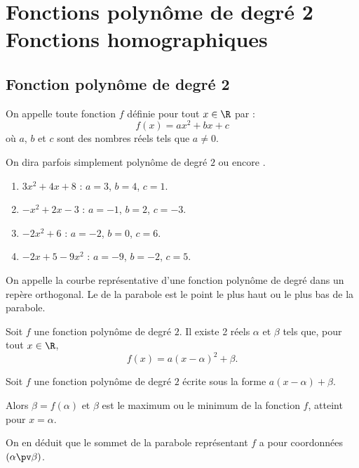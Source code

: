 \documentclass[10pt,openright,twoside,french]{book}
\begin{document}
\renewcommand\PartProgramme{Fonctions}
\chapter[Fonctions polynôme de degré 2, fonctions homographiques]{Fonctions polynôme de degré 2\\ Fonctions homographiques}\label{ch_degre2_homograhique}

\section{Fonction polynôme de degré 2}

\begin{Defi}
    On appelle  toute fonction $f$ définie pour tout $x \in \R$ par : \[f(x) = ax^2 + bx + c\] où $a$, $b$ et $c$ sont des nombres réels tels que $a\neq 0$.
\end{Defi}

\begin{Rmq}
	On dira parfois simplement polynôme de degré $2$ ou encore .
\end{Rmq}


\begin{Exemple}
	\begin{enumerate}
		\item $3x^2+4x + 8$ : $a = 3$, $b = 4$, $c = 1$.
		\item $-x^2+2x - 3$ : $a = -1$, $b = 2$, $c = -3$.
		\item $-2x^2 + 6$ : $a = -2$, $b = 0$, $c = 6$.
		\item $-2x+5 -9x^2$ : $a = -9$, $b = -2$, $c = 5$.
	\end{enumerate}
\end{Exemple}

\begin{Defi}
	On appelle  la courbe représentative d'une fonction polynôme de degré dans un repère orthogonal. Le  de la parabole est le point le plus haut ou le plus bas de la parabole.
\end{Defi}

\begin{Prop}
	Soit $f$ une fonction polynôme de degré $2$. Il existe 2 réels $\alpha$ et $\beta$ tels que, pour tout $x \in \R$, \[f(x) = a(x - \alpha)^2 + \beta.\]
\end{Prop}

\begin{Prop}
	Soit $f$ une fonction polynôme de degré $2$ écrite sous la forme $a(x - \alpha) + \beta$.\par
	Alors $\beta = f(\alpha)$ et $\beta$ est le maximum ou le minimum de la fonction $f$, atteint pour $x = \alpha$.\par
	On en déduit que le sommet de la parabole représentant $f$ a pour coordonnées $(\alpha \pv \beta)$.
\end{Prop}
\end{document}
